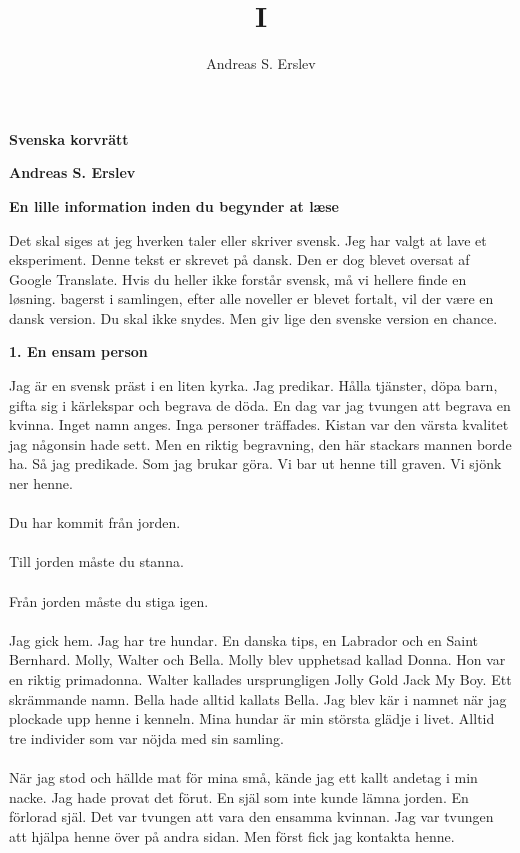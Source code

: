 \documentclass[]{article}
\title{I}
\author{Andreas S. Erslev}
\begin{document}
\begin{center}
	\Large\textbf{Svenska korvrätt}
\end{center}

\begin{center}
	\large\textbf{Andreas S. Erslev}
\end{center}

\begin{center}
	\large\textbf{En lille information inden du begynder at læse}
\end{center}

Det skal siges at jeg hverken taler eller skriver svensk. Jeg har valgt at lave et eksperiment. Denne tekst er skrevet på dansk. Den er dog blevet oversat af Google Translate. Hvis du heller ikke forstår svensk, må vi hellere finde en løsning. bagerst i samlingen, efter alle noveller er blevet fortalt, vil der være en dansk version. Du skal ikke snydes. Men giv lige den svenske version en chance.

\begin{center}
	\large\textbf{1. En ensam person}
\end{center}

Jag är en svensk präst i en liten kyrka. Jag predikar. Hålla tjänster, döpa barn, gifta sig i kärlekspar och begrava de döda. En dag var jag tvungen att begrava en kvinna. Inget namn anges. Inga personer träffades. Kistan var den värsta kvalitet jag någonsin hade sett. Men en riktig begravning, den här stackars mannen borde ha. Så jag predikade. Som jag brukar göra. Vi bar ut henne till graven. Vi sjönk ner henne.
\\ \\
Du har kommit från jorden.
\\ \\
Till jorden måste du stanna.
\\ \\
Från jorden måste du stiga igen.
\\ \\
Jag gick hem. Jag har tre hundar. En danska tips, en Labrador och en Saint Bernhard. Molly, Walter och Bella. Molly blev upphetsad kallad Donna. Hon var en riktig primadonna. Walter kallades ursprungligen Jolly Gold Jack My Boy. Ett skrämmande namn. Bella hade alltid kallats Bella. Jag blev kär i namnet när jag plockade upp henne i kenneln. Mina hundar är min största glädje i livet. Alltid tre individer som var nöjda med sin samling.
\\ \\
När jag stod och hällde mat för mina små, kände jag ett kallt andetag i min nacke. Jag hade provat det förut. En själ som inte kunde lämna jorden. En förlorad själ. Det var tvungen att vara den ensamma kvinnan. Jag var tvungen att hjälpa henne över på andra sidan. Men först fick jag kontakta henne.
\end{document}
